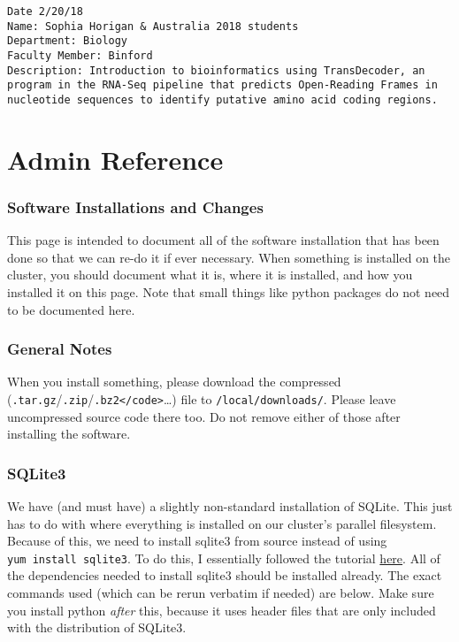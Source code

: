 \documentclass[]{book}
\begin{document}
\begin{verbatim}
Date 2/20/18
Name: Sophia Horigan & Australia 2018 students
Department: Biology
Faculty Member: Binford
Description: Introduction to bioinformatics using TransDecoder, an program in the RNA-Seq pipeline that predicts Open-Reading Frames in nucleotide sequences to identify putative amino acid coding regions.
\end{verbatim}

\chapter{Admin Reference}\label{admin-reference}

\subsection{Software Installations and
Changes}\label{software-installations-and-changes}

This page is intended to document all of the software installation that
has been done so that we can re-do it if ever necessary. When something
is installed on the cluster, you should document what it is, where it is
installed, and how you installed it on this page. Note that small things
like python packages do not need to be documented here.

\subsection{General Notes}\label{general-notes}

When you install something, please download the compressed
(\texttt{.tar.gz}/\texttt{.zip}/\texttt{.bz2\textless{}/code\textgreater{}}\ldots{})
file to \texttt{/local/downloads/}. Please leave uncompressed source
code there too. Do not remove either of those after installing the
software.

\subsection{SQLite3}\label{sqlite3}

We have (and must have) a slightly non-standard installation of SQLite.
This just has to do with where everything is installed on our cluster's
parallel filesystem. Because of this, we need to install sqlite3 from
source instead of using \texttt{yum\ install\ sqlite3}. To do this, I
essentially followed the tutorial
\href{https://bluebill.net/2016/04/24/install-python-and-sqlite-from-source/}{here}.
All of the dependencies needed to install sqlite3 should be installed
already. The exact commands used (which can be rerun verbatim if needed)
are below. Make sure you install python \emph{after} this, because it
uses header files that are only included with the distribution of
SQLite3.
\end{document}
